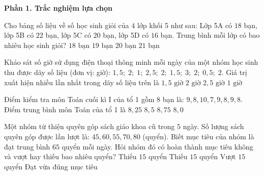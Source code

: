 \textbf{Phần 1. Trắc nghiệm lựa chọn}

\begin{ex} %
Cho bảng số liệu về số học sinh giỏi của $4$ lớp khối 5 như sau: Lớp 5A có $18$ bạn, lớp 5B có $22$ bạn, lớp 5C có $20$ bạn, lớp 5D có $16$ bạn. Trung bình mỗi lớp có bao nhiêu học sinh giỏi?
\choice
{$18\text{ bạn}$}
{\True $19\text{ bạn}$}
{$20\text{ bạn}$}
{$21\text{ bạn}$}
\end{ex}

\begin{ex} %
Khảo sát số giờ sử dụng điện thoại thông minh mỗi ngày của một nhóm học sinh thu được dãy số liệu (đơn vị: giờ): $1{,}5;\; 2;\; 1;\; 2{,}5;\; 2;\; 1{,}5;\; 3;\; 2;\; 0{,}5;\; 2$. Giá trị xuất hiện nhiều lần nhất trong dãy số liệu trên là
\choice
{$1{,}5\text{ giờ}$}
{\True $2\text{ giờ}$}
{$2{,}5\text{ giờ}$}
{$1\text{ giờ}$}
\end{ex}

\begin{ex} %
Điểm kiểm tra môn Toán cuối kì I của tổ 1 gồm $8$ bạn là: $9, 8, 10, 7, 9, 8, 9, 8$. Điểm trung bình môn Toán của tổ 1 là
\choice
{$8{,}25$}
{\True $8{,}5$}
{$8{,}75$}
{$8{,}0$}
\end{ex}

\begin{ex} %
Một nhóm từ thiện quyên góp sách giáo khoa cũ trong $5$ ngày. Số lượng sách quyên góp được lần lượt là: $45, 60, 55, 70, 80$ (quyển). Biết mục tiêu của nhóm là đạt trung bình $65$ quyển mỗi ngày. Hỏi nhóm đó có hoàn thành mục tiêu không và vượt hay thiếu bao nhiêu quyển?
\choice
{Thiếu $15$ quyển}
{\True Thiếu $15$ quyển}
{Vượt $15$ quyển}
{Đạt vừa đúng mục tiêu}
\end{ex}

